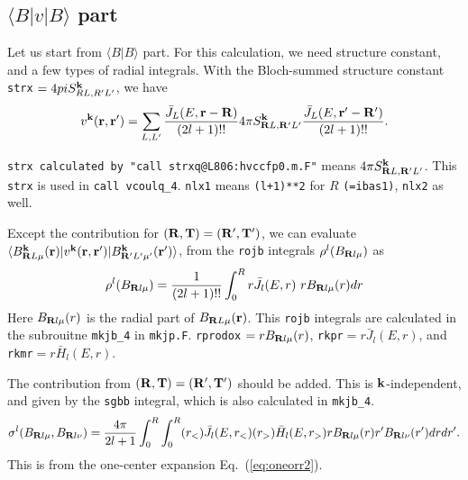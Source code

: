 \documentclass[a4paper,10pt,epsf,fleqn]{article}
\newcommand{\bfk}{{\bf k}}
\newcommand{\bfr}{{\bf r}}
\newcommand{\bfT}{{\bf T}}
\newcommand{\bfR}{{\bf R}}
\newcommand{\req}[1]{\mbox{Eq.~(\ref{#1})}}
\begin{document}
\subsection{$\langle B|v|B \rangle$ part}
\label{sec:bvbpart}
Let us start from $\langle B|B \rangle$ part.
For this calculation, we need structure constant, and a few types of
radial integrals.
With the Bloch-summed structure constant \verb!strx!
$=4 pi S^\bfk_{RL,R'L'}$, we have
\begin{eqnarray}
v^\bfk(\bfr,\bfr')=\sum_{L,L'} 
\frac{\bar{J}_L(E,\bfr-\bfR)}{(2l+1)!!} 
4 \pi S^{\bfk}_{\bfR{L},\bfR'{L'}}
\frac{\bar{J}_L(E,\bfr'-\bfR')}{(2l+1)!!}. 
\label{eq:vkbb}
\end{eqnarray}

\verb#strx calculated by "call strxq@L806:hvccfp0.m.F"# 
means $4 \pi S^\bfk_{\bfR{L},\bfR'L'}$. 
This \verb!strx! is used in  \verb!call vcoulq_4!. 
\verb#nlx1# means \verb#(l+1)**2# for $R$ 
\verb#(=ibas1)#, \verb#nlx2# as well.

Except the contribution for $(\bfR,\bfT)=(\bfR',\bfT')$,
we can evaluate
$\langle B^\bfk_{\bfR{L}\mu}(\bfr)|v^\bfk(\bfr,\bfr')|B^\bfk_{\bfR'{L'}\mu'}(\bfr') \rangle$, from the \verb#rojb# integrals $\rho^l(B_{\bfR{l}\mu})$  as
\begin{eqnarray}
\rho^l(B_{\bfR{l}\mu})=
\frac{1}{(2l+1)!!} \int_0^{R} r\bar{J}_l(E,r) \ r B_{\bfR{l}\mu}(r)  dr
\end{eqnarray}
Here $B_{\bfR{l}\mu}(r)$ is the radial part of $B_{\bfR{L}\mu}(\bfr)$.
This \verb!rojb! integrals are calculated in 
the subrouitne \verb!mkjb_4! in \verb#mkjp.F#.
\verb!rprodox! $=r B_{\bfR{l}\mu}(r)$, 
\verb!rkpr!$=r\bar{J}_l(E,r)$, and \verb!rkmr!$=r\bar{H}_l(E,r)$.

The contribution from $(\bfR,\bfT)=(\bfR',\bfT')$
should be added. This is $\bfk$-independent, and
given by the \verb!sgbb! integral, which is also calculated in \verb!mkjb_4!.
\begin{eqnarray}
\sigma^l(B_{\bfR{l}\mu},B_{\bfR{l}\nu})=
\frac{4\pi}{2l+1} 
\int_0^{R}\int_0^{R} (r_<)\bar{J}_l(E,r_<) (r_>)\bar{H}_l(E,r_>)
r B_{\bfR{l}\mu}(r) r' B_{\bfR{l}\nu}(r') dr dr'.
\end{eqnarray}
This is from the one-center expansion \req{eq:oneorr2}.
\end{document}
